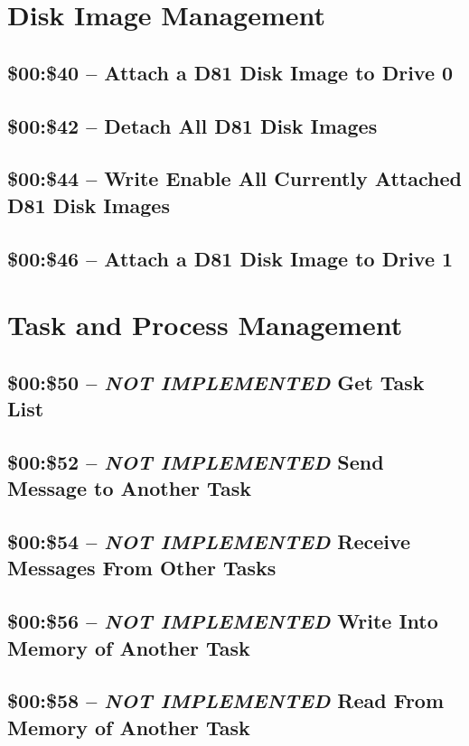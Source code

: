 \section{Disk Image Management}

\subsection{\$00:\$40 -- Attach a D81 Disk Image to Drive 0}
\subsection{\$00:\$42 -- Detach All D81 Disk Images}
\subsection{\$00:\$44 -- Write Enable All Currently Attached D81 Disk Images}
\subsection{\$00:\$46 -- Attach a D81 Disk Image to Drive 1}

\section{Task and Process Management}

\subsection{\$00:\$50 -- {\em NOT IMPLEMENTED} Get Task List}
\subsection{\$00:\$52 -- {\em NOT IMPLEMENTED} Send Message to Another Task}
\subsection{\$00:\$54 -- {\em NOT IMPLEMENTED} Receive Messages From Other Tasks}
\subsection{\$00:\$56 -- {\em NOT IMPLEMENTED} Write Into Memory of Another Task}
\subsection{\$00:\$58 -- {\em NOT IMPLEMENTED} Read From Memory of Another Task}

